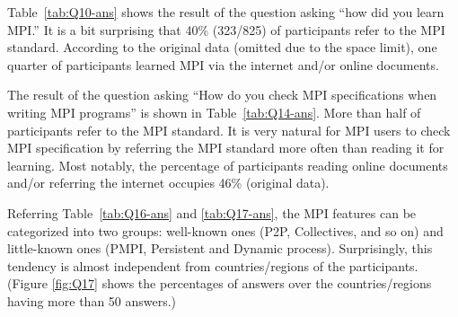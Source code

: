 \documentclass[sigconf,nonacm]{acmart}
\begin{document}
Table~\ref{tab:Q10-ans} shows the result of the question asking ``how
did you learn MPI.'' It is a bit surprising that 40\% (323/825) of
participants refer to the MPI standard. According to the original
data (omitted due to the space limit), one quarter of participants
learned MPI via the internet and/or online documents.

The result of the question asking ``How do you check MPI
specifications when writing MPI programs'' is shown in
Table~\ref{tab:Q14-ans}. More than half of participants refer to the
MPI standard. It is very natural for MPI users to check MPI
specification by referring the MPI standard more often than reading it
for learning. Most notably, the percentage of participants reading
online documents and/or referring the internet occupies 46\% (original
data).

Referring Table~\ref{tab:Q16-ans} and \ref{tab:Q17-ans}, the MPI
features can be categorized into two groups: well-known ones (P2P,
Collectives, and so on) and little-known ones (PMPI, Persistent and
Dynamic process). Surprisingly, this tendency is almost independent
from countries/regions of the participants.
(Figure \ref{fig:Q17} shows the percentages of answers over the
countries/regions having more than 50 answers.)

\end{document}
